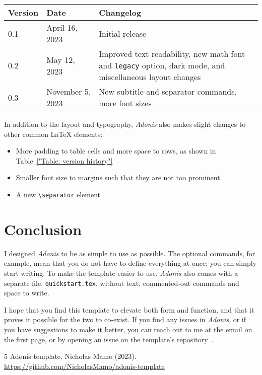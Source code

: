 \documentclass{adonis}
\begin{document}
		\begin{table*}[t!]
			\begin{tabularx}{\linewidth}{ l l X }
				\textbf{Version} & \textbf{Date}    & \textbf{Changelog}                                                                                               \\ \hline
				0.1              & April 16, 2023   & Initial release                                                                                                  \\
				0.2              & May 12, 2023     & Improved text readability, new math font and \texttt{legacy} option, dark mode, and miscellaneous layout changes \\
				0.3              & November 5, 2023 & New subtitle and separator commands, more font sizes                                                                                                                 
			\end{tabularx}
			\caption{The template's version history.}
			\label{"Table: version history"}
		\end{table*}
	
		In addition to the layout and typography, \textit{Adonis} also makes slight changes to other common \LaTeX{} elements:
		
		\begin{itemize}
			\item More padding to table cells and more space to rows, as shown in Table~\ref{"Table: version history"}
			\item Smaller font size to margins such that they are not too prominent
			\item A new \texttt{\textbackslash{}separator} element
		\end{itemize}
	
	\section{Conclusion}
	
		I designed \textit{Adonis} to be as simple to use as possible.
		The optional commands, for example, mean that you do not have to define everything at once; you can simply start writing.
		To make the template easier to use, \textit{Adonis} also comes with a separate file, \texttt{quickstart.tex}, without text, commented-out commands and space to write.
		
		I hope that you find this template to elevate both form and function, and that it proves it possible for the two to co-exist.
		If you find any issues in \textit{Adonis}, or if you have suggestions to make it better, you can reach out to me at the email on the first page, or by opening an issue on the template's repository~\cite{repository}.

	\begin{thebibliography}{5}
		Adonis template. Nicholas Mamo (2023). \url{https://github.com/NicholasMamo/adonis-template}
	\end{thebibliography}
	
\end{document}
